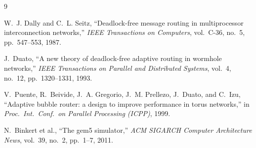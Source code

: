 \documentclass[11pt,a4paper]{article}
\begin{document}

\begin{thebibliography}{9}

W.~J. Dally and C.~L. Seitz,
``Deadlock-free message routing in multiprocessor interconnection networks,''
\emph{IEEE Transactions on Computers}, vol.~C-36, no.~5, pp.~547--553, 1987.

J.~Duato,
``A new theory of deadlock-free adaptive routing in wormhole networks,''
\emph{IEEE Transactions on Parallel and Distributed Systems}, vol.~4,
no.~12, pp.~1320--1331, 1993.

V.~Puente, R.~Beivide, J.~A. Gregorio, J.~M. Prellezo, J.~Duato, and C.~Izu,
``Adaptive bubble router: a design to improve performance in torus networks,''
in \emph{Proc.\ Int.\ Conf.\ on Parallel Processing (ICPP)}, 1999.

N.~Binkert et al., ``The gem5 simulator,'' \emph{ACM SIGARCH Computer
Architecture News}, vol.~39, no.~2, pp.~1--7, 2011.

\end{thebibliography}
\end{document}
